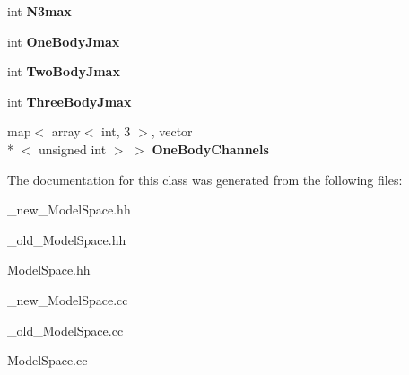 \begin{DoxyCompactItemize}
\item 
\hypertarget{classModelSpace_ab28d5ba1838ef9d91a3f7c570530ca7c}{int {\bfseries N3max}}\label{classModelSpace_ab28d5ba1838ef9d91a3f7c570530ca7c}

\item 
\hypertarget{classModelSpace_a4c8f0a4476a3b3da3fced59d899f0134}{int {\bfseries One\-Body\-Jmax}}\label{classModelSpace_a4c8f0a4476a3b3da3fced59d899f0134}

\item 
\hypertarget{classModelSpace_aa2fd94965eb8a508e5ea7d4c879bae0b}{int {\bfseries Two\-Body\-Jmax}}\label{classModelSpace_aa2fd94965eb8a508e5ea7d4c879bae0b}

\item 
\hypertarget{classModelSpace_af9ca130d96f582d0ed1a4ef5373bcd05}{int {\bfseries Three\-Body\-Jmax}}\label{classModelSpace_af9ca130d96f582d0ed1a4ef5373bcd05}

\item 
\hypertarget{classModelSpace_aefea3bed6370d0325835f61ba7ec2689}{map$<$ array$<$ int, 3 $>$, vector\\*
$<$ unsigned int $>$ $>$ {\bfseries One\-Body\-Channels}}\label{classModelSpace_aefea3bed6370d0325835f61ba7ec2689}

\end{DoxyCompactItemize}


The documentation for this class was generated from the following files\-:\begin{DoxyCompactItemize}
\item 
\-\_\-new\-\_\-\-Model\-Space.\-hh\item 
\-\_\-old\-\_\-\-Model\-Space.\-hh\item 
Model\-Space.\-hh\item 
\-\_\-new\-\_\-\-Model\-Space.\-cc\item 
\-\_\-old\-\_\-\-Model\-Space.\-cc\item 
Model\-Space.\-cc\end{DoxyCompactItemize}
